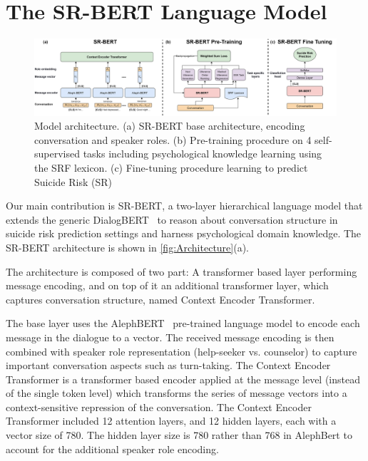 \documentclass[letterpaper]{article} %
\newcommand{\kibitz}[2]{\ifnum\Comments=1{\textcolor{#1}{#2}}\fi}
\newcommand{\kg}[1]{\kibitz{red}{[KG:#1]}}
\newcommand{\di}[1]{\kibitz{blue}{[DI:#1]}}
\begin{document}
\section{The SR-BERT Language Model}

\begin{figure}
\centering
\includegraphics[width=2.2\columnwidth]{figures/ModelArchitecture.png}
\caption{Model architecture. (a) SR-BERT base architecture, encoding conversation and speaker roles.
(b) Pre-training procedure on 4 self-supervised tasks including psychological knowledge learning using the SRF lexicon.
(c) Fine-tuning procedure learning to predict Suicide Risk (SR)}

\label{fig:Architecture}

\end{figure}

Our main contribution is
SR-BERT,  a two-layer hierarchical language model that  extends the generic DialogBERT~\cite{gu2021dialogbert} to reason about  conversation structure in suicide risk prediction settings and harness psychological domain knowledge.
The SR-BERT architecture is shown in \autoref{fig:Architecture}(a).


The architecture is composed of two part: A transformer based layer performing message encoding, and on top of it an additional transformer layer, which captures conversation structure, named  Context Encoder Transformer.

The base layer uses the AlephBERT~\cite{seker2022alephbert} pre-trained language model to encode each message in the dialogue to a vector. The received message encoding is then combined with speaker role representation (help-seeker vs. counselor) to capture important conversation aspects such as turn-taking. The Context Encoder Transformer is a transformer based encoder applied at the message level (instead of the single token level) which transforms the series of message vectors into a context-sensitive repression of the conversation.  The Context Encoder Transformer included 12 attention layers, and 12 hidden layers, each with a vector size of 780. The hidden layer size is 780 rather than 768 in AlephBert to account for the additional speaker role encoding.
\end{document}
